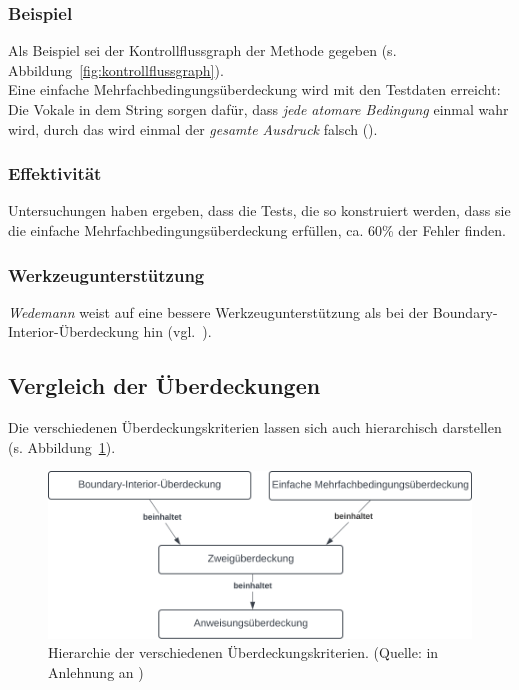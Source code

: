 \subsubsection*{Beispiel}
Als Beispiel sei der Kontrollflussgraph der Methode  gegeben (s. Abbildung~\ref{fig:kontrollflussgraph}).\\
Eine einfache Mehrfachbedingungsüberdeckung wird mit den Testdaten  erreicht: Die Vokale in dem String sorgen dafür, dass \textit{jede atomare Bedingung} einmal wahr wird, durch das  wird einmal der \textit{gesamte Ausdruck} falsch ().

\subsubsection*{Effektivität}
Untersuchungen haben ergeben, dass die Tests, die so konstruiert werden, dass sie die einfache Mehrfachbedingungsüberdeckung  erfüllen, ca. 60\% der Fehler finden.

\subsubsection*{Werkzeugunterstützung}
\textit{Wedemann} weist auf eine bessere Werkzeugunterstützung als bei der Boundary-Interior-Überdeckung hin (vgl.~\cite[53]{Wed09c}).

\subsection{Vergleich der Überdeckungen}

Die verschiedenen Überdeckungskriterien lassen sich auch hierarchisch darstellen (s. Abbildung~\ref{fig:coverage-criteria-hierarchy}).

\begin{figure}
    \centering
    \includegraphics[scale=0.4]{part four/Testende Verfahren/img/coverage-criteria-hierarchy}
    \caption{Hierarchie der verschiedenen Überdeckungskriterien. (Quelle: in Anlehnung an \cite[Abb. 5.2, 53]{Wed09c})}
    \label{fig:coverage-criteria-hierarchy}
\end{figure}


